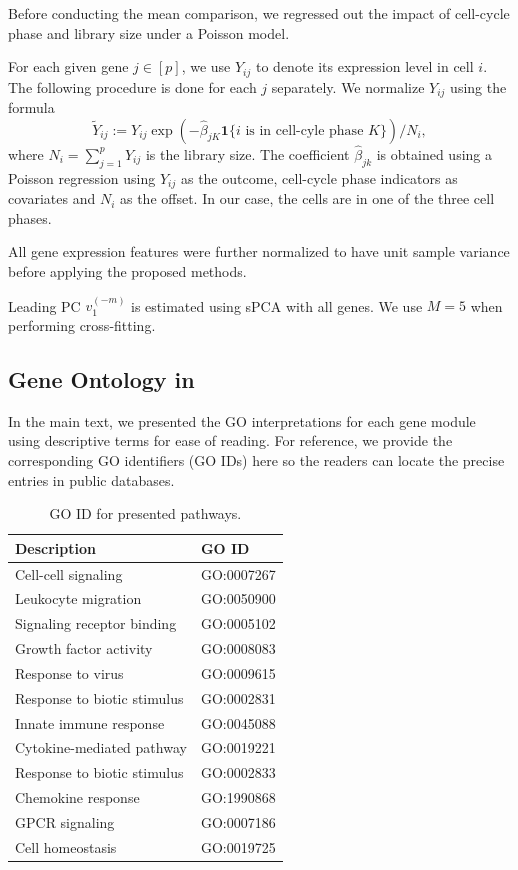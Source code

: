 \documentclass[11pt]{article}
\begin{document}
Before conducting the mean comparison, we regressed out the impact of cell-cycle phase and library size under a Poisson model. 

For each given gene $j\in [p]$, we use $Y_{ij}$ to denote its expression level in cell $i$. The following procedure is done for each $j$ separately. We normalize $Y_{ij}$ using the formula
\begin{equation*}
    \tilde{Y}_{ij}:=Y_{ij} \exp \left(-\hat{\beta}_{jK} \mathbf{1}\{i \text { is in cell-cyle phase } K\}\right) / N_i,
\end{equation*}
where $N_i = \sum_{j=1}^p Y_{ij}$ is the library size. The coefficient $\hat \beta_{jk}$ is obtained using a Poisson regression using $Y_{ij}$ as the outcome, cell-cycle phase indicators as covariates and $N_i$ as the offset. In our case, the cells are in one of the three cell phases.

All gene expression features were further normalized to have unit sample variance before applying the proposed methods. 

Leading PC $v_1^{(-m)}$ is estimated using sPCA \cite{PMA} with all genes. We use $M=5$ when performing cross-fitting. 

\subsection{Gene Ontology in }\label{app: GOID}

In the main text, we presented the GO interpretations for each gene module using descriptive terms for ease of reading. For reference, we provide the corresponding GO identifiers (GO IDs) here so the readers can locate the precise entries in public databases.

\begin{table}[!t]
\centering
\begin{tabular}{ll}
\hline
\textbf{Description} & \textbf{GO ID} \\
\hline
Cell-cell signaling & GO:0007267 \\
Leukocyte migration & GO:0050900 \\
Signaling receptor binding & GO:0005102 \\
Growth factor activity & GO:0008083 \\
Response to virus & GO:0009615 \\
Response to biotic stimulus & GO:0002831 \\
Innate immune response & GO:0045088 \\
Cytokine-mediated pathway & GO:0019221 \\
Response to biotic stimulus & GO:0002833 \\
Chemokine response & GO:1990868 \\
GPCR signaling & GO:0007186 \\
Cell homeostasis & GO:0019725 \\
\hline
\end{tabular}
\caption{GO ID for presented pathways.}
\label{tab:short_desc_go_ids}
\end{table}
\end{document}
